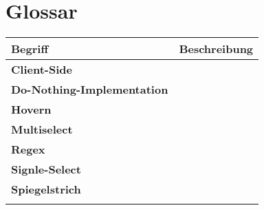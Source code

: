 \chapter{Glossar}
\label{chap:glossary}

\begin{table}[!ht]
    \label{table:Glossary}
    \footnotesize
    \begin{threeparttable}
        \begin{tabular}{ l | l }
            \bf{Begriff}    & \bf{Beschreibung} \\
            \hline \hline
            \bf{Client-Side} &  \\
            \hline
            \bf{Do-Nothing-Implementation} &  \\
            \hline
            \bf{Hovern} &  \\
            \hline
            \bf{Multiselect} &  \\
            \hline
            \bf{Regex} &  \\
            \hline
            \bf{Signle-Select} &  \\
            \hline
            \bf{Spiegelstrich} &  \\
            \hline
            \bf{} &  \\
        \end{tabular}
    \end{threeparttable}
\end{table}

